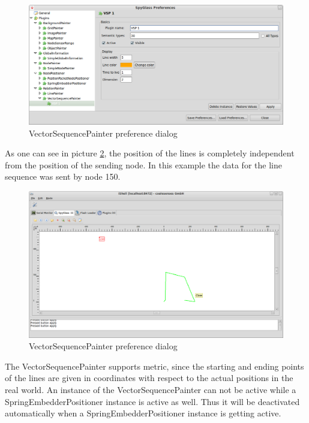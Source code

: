 \begin{figure}[htb]
  \begin{center}
    \includegraphics[width=13.2cm]{./pics/vectorsequencepainter_prefpage}
    \caption{VectorSequencePainter preference dialog}
    \label{pic:vsp_preferences}
  \end{center}
\end{figure}

As one can see in picture \ref{pic:vsp}, the position of the lines is completely independent from the position of the
sending node. In this example the data for the line sequence was sent by node 150.

\begin{figure}[htb]
  \begin{center}
    \includegraphics[width=13.2cm]{./pics/vectorsequencepainter}
    \caption{VectorSequencePainter preference dialog}
    \label{pic:vsp}
  \end{center}
\end{figure}

The VectorSequencePainter supports metric, since the starting and ending points of the lines are
given in coordinates with respect to the actual positions in the real world. An instance of the VectorSequencePainter can not
be active while a SpringEmbedderPositioner instance is active as well. Thus it will be deactivated automatically when a
SpringEmbedderPositioner instance is getting active.

